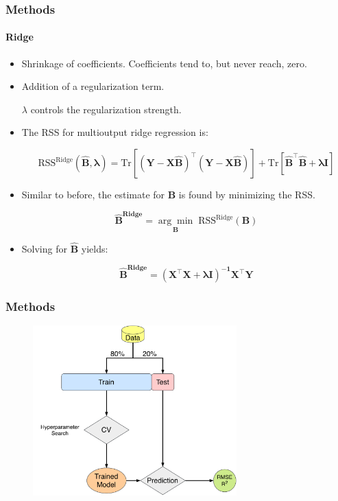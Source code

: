 \documentclass{beamer}
\begin{document}
\begin{frame}
	\frametitle{Methods}
\framesubtitle{Ridge}
\begin{itemize}

\item Shrinkage of coefficients. Coefficients tend to, but never reach, zero.

\item Addition of a regularization term.

$\lambda$ controls the regularization strength.

\item The RSS for multioutput ridge regression is:

\begin{equation} 
	\label{eqn:rss-ridge}
	\text{RSS}^{\text{Ridge}}(\mathbf{\hat{B}, \boldsymbol{\lambda} }) = \text{Tr} [\mathbf{(Y-X\hat{B})^\intercal (Y-X\hat{B})}] + \text{Tr}[\mathbf{\hat{B}^\intercal \hat{B}+ \boldsymbol{\lambda} I}]
\end{equation}

\item Similar to before, the estimate for $\mathbf{B}$ is found by minimizing the RSS.

\begin{equation}
	\label{eqn:ridgebetahat}
	\mathbf{\hat{B}^\text{Ridge}} = \underset{\mathbf{B}}{\arg\min} 	\; \text{RSS}^{\text{Ridge}}(\mathbf{B})
\end{equation}	

\item Solving for $\mathbf{\hat{B}}$ yields:

\begin{equation}
	\label{eqn:ridgebetahat2}
	\mathbf{\hat{B}^\text{Ridge}} = \mathbf{(X^\intercal X + \boldsymbol{\lambda}  I )^{-1} X^\intercal Y}
\end{equation}

\end{itemize}

\end{frame}

\begin{frame}
	\frametitle{Methods}
	
	\begin{figure}[h]
		\includegraphics[width=0.7\textwidth]{../../figures/methods-schema.pdf}
	\end{figure}
	
\end{frame}
\end{document}
